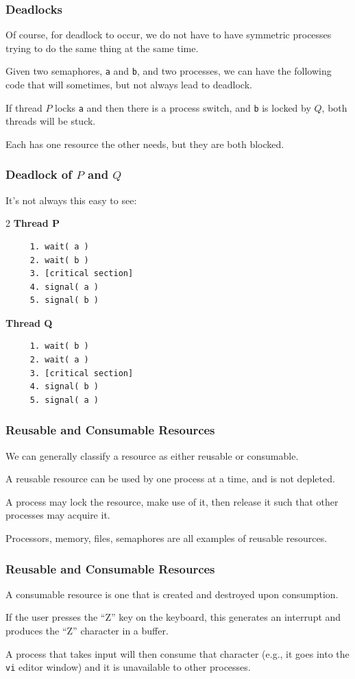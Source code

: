 \begin{frame}
	\frametitle{Deadlocks}

	Of course, for deadlock to occur, we do not have to have symmetric processes trying to do the same thing at the same time.

	Given two semaphores, \texttt{a} and \texttt{b}, and two processes, we can have the following code that will sometimes, but not always lead to deadlock.

	If thread $P$ locks \texttt{a} and then there is a process switch, and \texttt{b} is locked by $Q$, both threads will be stuck.

	Each has one resource the other needs, but they are both blocked.


\end{frame}

\begin{frame}[fragile]
	\frametitle{Deadlock of $P$ and $Q$}
	It's not always this easy to see:


	\begin{multicols}{2}
		\textbf{Thread P}
		\begin{verbatim}
	 1. wait( a ) 
	 2. wait( b )
	 3. [critical section]
	 4. signal( a )
	 5. signal( b )
  \end{verbatim}
		\columnbreak
		\textbf{Thread Q}
		\begin{verbatim}
	 1. wait( b ) 
	 2. wait( a )
	 3. [critical section]
	 4. signal( b )
	 5. signal( a )
  \end{verbatim}
	\end{multicols}

\end{frame}


\begin{frame}
	\frametitle{Reusable and Consumable Resources}
	We can generally classify a resource as either \alert{reusable} or \alert{consumable}.

	A reusable resource can be used by one process at a time, and is not depleted.

	A process may lock the resource, make use of it, then release it such that other processes may acquire it.

	Processors, memory, files, semaphores are all examples of reusable resources.

\end{frame}

\begin{frame}
	\frametitle{Reusable and Consumable Resources}

	A consumable resource is one that is created and destroyed upon consumption.

	If the user presses the ``Z'' key on the keyboard, this generates an interrupt and produces the ``Z'' character in a buffer.

	A process that takes input will then consume that character (e.g., it goes into the \texttt{vi} editor window) and it is unavailable to other processes.

\end{frame}

